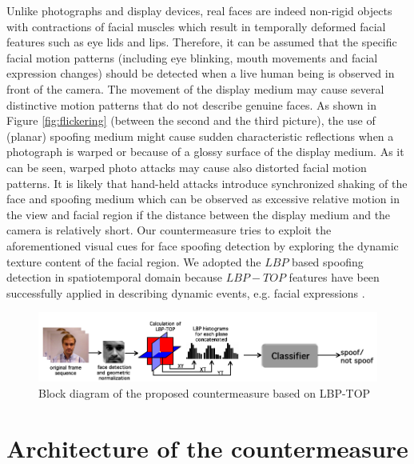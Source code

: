 Unlike photographs and display devices, real faces are indeed non-rigid objects with contractions of facial muscles which result in temporally deformed facial features such as eye lids and lips. Therefore, it can be assumed that the specific facial motion patterns (including eye blinking, mouth movements and facial expression changes) should be detected when a live human being is observed in front of the camera. The movement of the display medium may cause several distinctive motion patterns that do not describe genuine faces. As shown in Figure \ref{fig:flickering} (between the second and the third picture), the use of (planar) spoofing medium might cause sudden characteristic reflections when a photograph is warped or because of a glossy surface of the display medium. As it can be seen, warped photo attacks may cause also distorted facial motion patterns. It is likely that hand-held attacks introduce synchronized shaking of the face and spoofing medium which can be observed as excessive relative motion in the view and facial region if the distance between the display medium and the camera is relatively short. Our countermeasure tries to exploit the aforementioned visual cues for face spoofing detection by exploring the dynamic texture content of the facial region. We adopted the $LBP$ based spoofing detection in spatiotemporal domain because $LBP-TOP$ features have been successfully applied in describing dynamic events, e.g. facial expressions \cite{zhao2007dynamic}.


\begin{figure}[!htb]
\begin{center}
\includegraphics [width=16cm] {images/proposed_countermeasure/countermeasure_2.png}
\caption[Block diagram of the proposed countermeasure based on LBP-TOP]{Block diagram of the proposed countermeasure based on LBP-TOP} \label{fig_countermeasure}
\end{center}
\end{figure}

\section{Architecture of the countermeasure}
\label{sec_proposed_counter}

